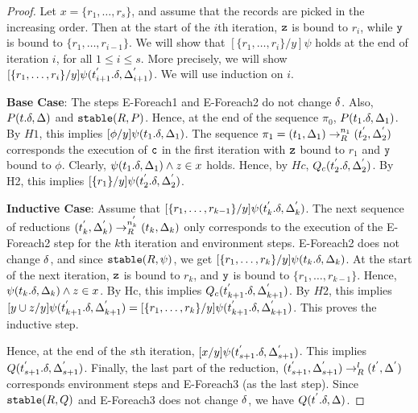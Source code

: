 \documentclass[acmlarge,anonymous]{acmart}\settopmatter{printfolios=true}
\begin{document}
\begin{proof}
Let $x = \{r_1, \ldots, r_s\}$, and assume that the records are picked in the increasing order. Then at the start of the $i$th iteration, ${\tt z}$ is bound to $r_i$, while ${\tt y}$ is bound to $\{r_1, \ldots, r_{i-1}\}$. We will show that $[\{r_1,\ldots, r_i\} / y]\psi$ holds at the end of iteration $i$, for all $1 \leq i \leq s$. More precisely, we will show $[\{r_1,\ldots, r_i\} / y]\psi(t_{i+1}^{'}.\delta, \Delta_{i+1}^{'})$. We will use induction on $i$.

\textbf{Base Case}: The steps E-Foreach1 and E-Foreach2 do not change $\delta$. Also, $P(t.\delta, \Delta)$ and $\mathtt{stable}(R, P)$. Hence, at the end of the sequence $\pi_0$, $P(t_{1}.\delta, \Delta_{1})$. By $H1$, this implies $[\phi / y] \psi(t_1.\delta, \Delta_1)$. The sequence $\pi_1 = (t_{1}, \Delta_{1}) \rightarrow_{R}^{n_1} (t_{2}^{'}, \Delta_{2}^{'})$ corresponds the execution of ${\tt c}$ in the first iteration with ${\tt z}$ bound to $r_1$ and ${\tt y}$ bound to $\phi$. Clearly, $\psi(t_1.\delta, \Delta_1) \wedge z \in x$ holds. Hence, by $Hc$, $Q_c(t_{2}^{'}.\delta, \Delta_{2}^{'})$. By H2, this implies $[\{r_1\} / y] \psi(t_2^{'}.\delta, \Delta_{2}^{'})$.

\textbf{Inductive Case}: Assume that $[\{r_1,\ldots, r_{k-1}\} / y]\psi(t_{k}^{'}.\delta, \Delta_{k}^{'})$. The next sequence of reductions $(t_{k}^{'}, \Delta_{k}^{'}) \rightarrow_{R}^{n_{k}^{'}} (t_k, \Delta_k)$ only corresponds to the execution of the E-Foreach2 step for the $k$th iteration and environment steps. E-Foreach2 does not change $\delta$, and since $\mathtt{stable}(R, \psi)$, we get $[\{r_1,\ldots, r_k\} / y]\psi(t_{k}.\delta, \Delta_{k})$. At the start of the next iteration, ${\tt z}$ is bound to $r_{k}$, and ${\tt y}$ is bound to $\{r_1, \ldots, r_{k-1}\}$. Hence, $\psi(t_k.\delta, \Delta_k) \wedge z \in x$. By Hc, this implies $Q_c(t_{k+1}^{'}.\delta, \Delta_{k+1}^{'})$. By $H2$, this implies $[y \cup z / y] \psi(t_{k+1}^{'}.\delta, \Delta_{k+1}^{'}) = [\{r_1, \ldots, r_k\} / y]\psi(t_{k+1}^{'}.\delta, \Delta_{k+1}^{'})$. This proves the inductive step.

Hence, at the end of the $s$th iteration, $[x / y]\psi(t_{s+1}^{'}.\delta, \Delta_{s+1}^{'})$. This implies $Q(t_{s+1}^{'}.\delta, \Delta_{s+1}^{'})$. Finally, the last part of the reduction, $(t_{s+1}^{'}, \Delta_{s+1}^{'}) \rightarrow_{R}^{l} (t^{'}, \Delta^{'})$ corresponds environment steps and E-Foreach3 (as the last step). Since $\mathtt{stable}(R, Q)$ and E-Foreach3 does not change $\delta$, we have $Q(t^{'}.\delta, \Delta)$. 

\end{proof}
\end{document}
